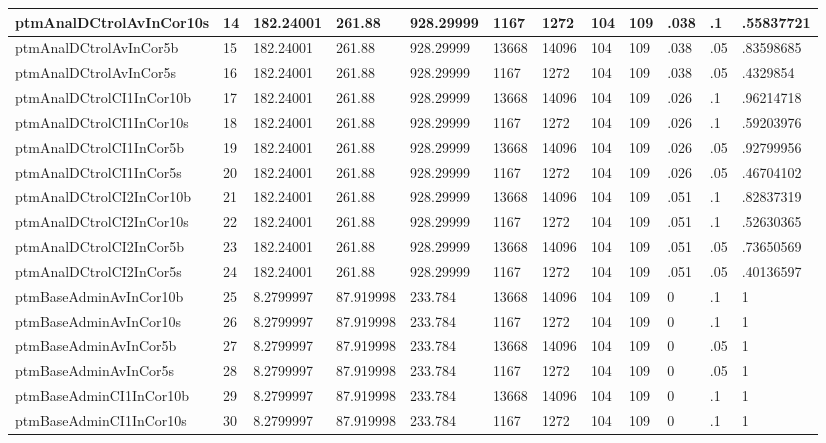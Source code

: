 \begin{table}[htbp]
\begin{tabular}{|l|l|l|l|l|l|l|l|l|l|l|l|}
ptmAnalDCtrolAvInCor10s & 14 & 182.24001 & 261.88 & 928.29999 & 1167 & 1272 & 104 & 109 & .038 & .1 & .55837721 \\ \hline 
ptmAnalDCtrolAvInCor5b & 15 & 182.24001 & 261.88 & 928.29999 & 13668 & 14096 & 104 & 109 & .038 & .05 & .83598685 \\ \hline 
ptmAnalDCtrolAvInCor5s & 16 & 182.24001 & 261.88 & 928.29999 & 1167 & 1272 & 104 & 109 & .038 & .05 & .4329854 \\ \hline 
ptmAnalDCtrolCI1InCor10b & 17 & 182.24001 & 261.88 & 928.29999 & 13668 & 14096 & 104 & 109 & .026 & .1 & .96214718 \\ \hline 
ptmAnalDCtrolCI1InCor10s & 18 & 182.24001 & 261.88 & 928.29999 & 1167 & 1272 & 104 & 109 & .026 & .1 & .59203976 \\ \hline 
ptmAnalDCtrolCI1InCor5b & 19 & 182.24001 & 261.88 & 928.29999 & 13668 & 14096 & 104 & 109 & .026 & .05 & .92799956 \\ \hline 
ptmAnalDCtrolCI1InCor5s & 20 & 182.24001 & 261.88 & 928.29999 & 1167 & 1272 & 104 & 109 & .026 & .05 & .46704102 \\ \hline 
ptmAnalDCtrolCI2InCor10b & 21 & 182.24001 & 261.88 & 928.29999 & 13668 & 14096 & 104 & 109 & .051 & .1 & .82837319 \\ \hline 
ptmAnalDCtrolCI2InCor10s & 22 & 182.24001 & 261.88 & 928.29999 & 1167 & 1272 & 104 & 109 & .051 & .1 & .52630365 \\ \hline 
ptmAnalDCtrolCI2InCor5b & 23 & 182.24001 & 261.88 & 928.29999 & 13668 & 14096 & 104 & 109 & .051 & .05 & .73650569 \\ \hline 
ptmAnalDCtrolCI2InCor5s & 24 & 182.24001 & 261.88 & 928.29999 & 1167 & 1272 & 104 & 109 & .051 & .05 & .40136597 \\ \hline 
ptmBaseAdminAvInCor10b & 25 & 8.2799997 & 87.919998 & 233.784 & 13668 & 14096 & 104 & 109 & 0 & .1 & 1 \\ \hline 
ptmBaseAdminAvInCor10s & 26 & 8.2799997 & 87.919998 & 233.784 & 1167 & 1272 & 104 & 109 & 0 & .1 & 1 \\ \hline 
ptmBaseAdminAvInCor5b & 27 & 8.2799997 & 87.919998 & 233.784 & 13668 & 14096 & 104 & 109 & 0 & .05 & 1 \\ \hline 
ptmBaseAdminAvInCor5s & 28 & 8.2799997 & 87.919998 & 233.784 & 1167 & 1272 & 104 & 109 & 0 & .05 & 1 \\ \hline 
ptmBaseAdminCI1InCor10b & 29 & 8.2799997 & 87.919998 & 233.784 & 13668 & 14096 & 104 & 109 & 0 & .1 & 1 \\ \hline 
ptmBaseAdminCI1InCor10s & 30 & 8.2799997 & 87.919998 & 233.784 & 1167 & 1272 & 104 & 109 & 0 & .1 & 1 \\ \hline 

\end{tabular}
\end{table}
